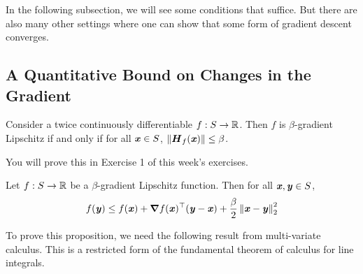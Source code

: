 In the following subsection, we will see some conditions that
suffice.
But there are also many other settings where one can show that some
form of gradient descent converges.

\subsection{A Quantitative Bound on Changes in the Gradient}

\begin{proposition}
\label{prp:hessiangradlip}
  Consider a twice continuously differentiable $f: S \to \mathbb{R}$.
  Then $f$ is $\beta$-gradient Lipschitz if and only if for all $\boldsymbol{\mathit{x}} \in
 S$,
  $\left\| \boldsymbol{{H}}_f(\boldsymbol{\mathit{x}}) \right\| \leq \beta$.
\end{proposition}
 You will prove this in Exercise 1 of this week's exercises.

\begin{proposition}
  \label{prp:lipgradub}
  Let $f: S \to \mathbb{R}$ be a $\beta$-gradient Lipschitz function.
  Then for all $\boldsymbol{\mathit{x}}, \boldsymbol{\mathit{y}} \in S$,
  \[
    f(\boldsymbol{\mathit{y}}) \leq f(\boldsymbol{\mathit{x}}) + \boldsymbol{\nabla} f(\boldsymbol{\mathit{x}})^\top (\boldsymbol{\mathit{y}}-\boldsymbol{\mathit{x}}) + \frac{\beta}{2}
    \left\| \boldsymbol{\mathit{x}}-\boldsymbol{\mathit{y}} \right\|_2^2
    \]
\end{proposition}

To prove this proposition, we need the following result from
multi-variate calculus. This is a restricted form of the fundamental
theorem of calculus for line integrals.

